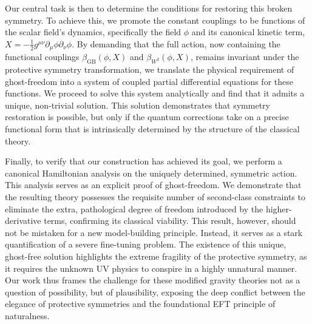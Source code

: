 \documentclass[twocolumn]{aastex631}
\begin{document}
Our central task is then to determine the conditions for restoring this broken symmetry. To achieve this, we promote the constant couplings to be functions of the scalar field's dynamics, specifically the field $\phi$ and its canonical kinetic term, $X = -\frac{1}{2}g^{\mu\nu}\partial_\mu\phi\partial_\nu\phi$. By demanding that the full action, now containing the functional couplings $\beta_{\text{GB}}(\phi, X)$ and $\beta_{W^2}(\phi, X)$, remains invariant under the protective symmetry transformation, we translate the physical requirement of ghost-freedom into a system of coupled partial differential equations for these functions. We proceed to solve this system analytically and find that it admits a unique, non-trivial solution. This solution demonstrates that symmetry restoration is possible, but only if the quantum corrections take on a precise functional form that is intrinsically determined by the structure of the classical theory.

Finally, to verify that our construction has achieved its goal, we perform a canonical Hamiltonian analysis on the uniquely determined, symmetric action. This analysis serves as an explicit proof of ghost-freedom. We demonstrate that the resulting theory possesses the requisite number of second-class constraints to eliminate the extra, pathological degree of freedom introduced by the higher-derivative terms, confirming its classical viability. This result, however, should not be mistaken for a new model-building principle. Instead, it serves as a stark quantification of a severe fine-tuning problem. The existence of this unique, ghost-free solution highlights the extreme fragility of the protective symmetry, as it requires the unknown UV physics to conspire in a highly unnatural manner. Our work thus frames the challenge for these modified gravity theories not as a question of possibility, but of plausibility, exposing the deep conflict between the elegance of protective symmetries and the foundational EFT principle of naturalness.
\end{document}
